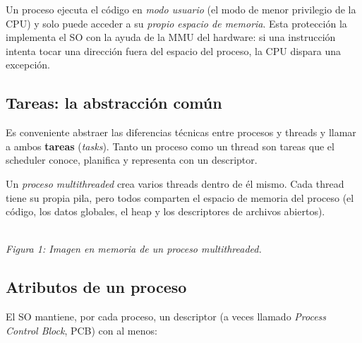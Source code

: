 \documentclass[11pt,a4paper]{article}
\begin{document}
Un proceso ejecuta el código en \emph{modo usuario} (el modo de menor
privilegio de la CPU) y solo puede acceder a su \emph{propio espacio
de memoria}. Esta protección la implementa el SO con la ayuda de la
MMU del hardware: si una instrucción intenta tocar una dirección fuera
del espacio del proceso, la CPU dispara una excepción.

\subsection{Tareas: la abstracción común}

Es conveniente abstraer las diferencias técnicas entre procesos y
threads y llamar a ambos \textbf{tareas} (\emph{tasks}). Tanto un
proceso como un thread son tareas que el scheduler conoce, planifica
y representa con un descriptor.

Un \emph{proceso multithreaded} crea varios threads dentro de él
mismo. Cada thread tiene su propia pila, pero todos comparten el
espacio de memoria del proceso (el código, los datos globales, el
heap y los descriptores de archivos abiertos).

\begin{center}
\\
\small\emph{Figura 1: Imagen en memoria de un proceso multithreaded.}
\end{center}

\subsection{Atributos de un proceso}

El SO mantiene, por cada proceso, un descriptor (a veces llamado
\emph{Process Control Block}, PCB) con al menos:
\end{document}
